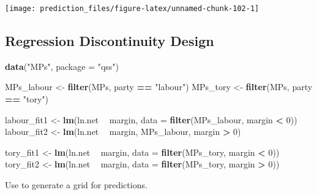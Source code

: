 \documentclass[]{book}
\newenvironment{Shaded}{\begin{snugshade}}{\end{snugshade}}
\newcommand{\KeywordTok}[1]{\textcolor[rgb]{0.13,0.29,0.53}{\textbf{#1}}}
\newcommand{\DataTypeTok}[1]{\textcolor[rgb]{0.13,0.29,0.53}{#1}}
\newcommand{\DecValTok}[1]{\textcolor[rgb]{0.00,0.00,0.81}{#1}}
\newcommand{\StringTok}[1]{\textcolor[rgb]{0.31,0.60,0.02}{#1}}
\newcommand{\OperatorTok}[1]{\textcolor[rgb]{0.81,0.36,0.00}{\textbf{#1}}}
\newcommand{\NormalTok}[1]{#1}
\theoremstyle{definition}
\theoremstyle{definition}
\theoremstyle{definition}
\theoremstyle{remark}
\begin{document}
\begin{center}\texttt{[image: prediction\_files/figure-latex/unnamed-chunk-102-1]} \end{center}

\subsection{Regression Discontinuity
Design}\label{regression-discontinuity-design}

\begin{Shaded}
\begin{Highlighting}[]
\KeywordTok{data}\NormalTok{(}\StringTok{"MPs"}\NormalTok{, }\DataTypeTok{package =} \StringTok{"qss"}\NormalTok{)}

\NormalTok{MPs_labour <-}\StringTok{ }\KeywordTok{filter}\NormalTok{(MPs, party }\OperatorTok{==}\StringTok{ "labour"}\NormalTok{)}
\NormalTok{MPs_tory <-}\StringTok{ }\KeywordTok{filter}\NormalTok{(MPs, party }\OperatorTok{==}\StringTok{ "tory"}\NormalTok{)}

\NormalTok{labour_fit1 <-}\StringTok{ }\KeywordTok{lm}\NormalTok{(ln.net }\OperatorTok{~}\StringTok{ }\NormalTok{margin,}
                 \DataTypeTok{data =} \KeywordTok{filter}\NormalTok{(MPs_labour, margin }\OperatorTok{<}\StringTok{ }\DecValTok{0}\NormalTok{))}
\NormalTok{labour_fit2 <-}\StringTok{ }\KeywordTok{lm}\NormalTok{(ln.net }\OperatorTok{~}\StringTok{ }\NormalTok{margin, MPs_labour, margin }\OperatorTok{>}\StringTok{ }\DecValTok{0}\NormalTok{)}

\NormalTok{tory_fit1 <-}\StringTok{ }\KeywordTok{lm}\NormalTok{(ln.net }\OperatorTok{~}\StringTok{ }\NormalTok{margin,}
                \DataTypeTok{data =} \KeywordTok{filter}\NormalTok{(MPs_tory, margin }\OperatorTok{<}\StringTok{ }\DecValTok{0}\NormalTok{))}
\NormalTok{tory_fit2 <-}\StringTok{ }\KeywordTok{lm}\NormalTok{(ln.net }\OperatorTok{~}\StringTok{ }\NormalTok{margin, }\DataTypeTok{data =} \KeywordTok{filter}\NormalTok{(MPs_tory, margin }\OperatorTok{>}\StringTok{ }\DecValTok{0}\NormalTok{))}
\end{Highlighting}
\end{Shaded}

Use to generate a grid for predictions.
\end{document}
